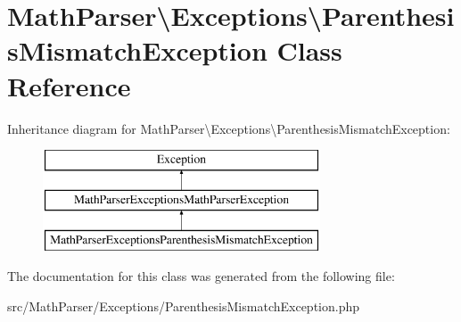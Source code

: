 \hypertarget{classMathParser_1_1Exceptions_1_1ParenthesisMismatchException}{\section{Math\-Parser\textbackslash{}Exceptions\textbackslash{}Parenthesis\-Mismatch\-Exception Class Reference}
\label{classMathParser_1_1Exceptions_1_1ParenthesisMismatchException}
}
Inheritance diagram for Math\-Parser\textbackslash{}Exceptions\textbackslash{}Parenthesis\-Mismatch\-Exception\-:\begin{figure}[H]
\begin{center}
\leavevmode
\includegraphics[height=3.000000cm]{classMathParser_1_1Exceptions_1_1ParenthesisMismatchException}
\end{center}
\end{figure}


The documentation for this class was generated from the following file\-:\begin{DoxyCompactItemize}
\item 
src/\-Math\-Parser/\-Exceptions/Parenthesis\-Mismatch\-Exception.\-php\end{DoxyCompactItemize}
